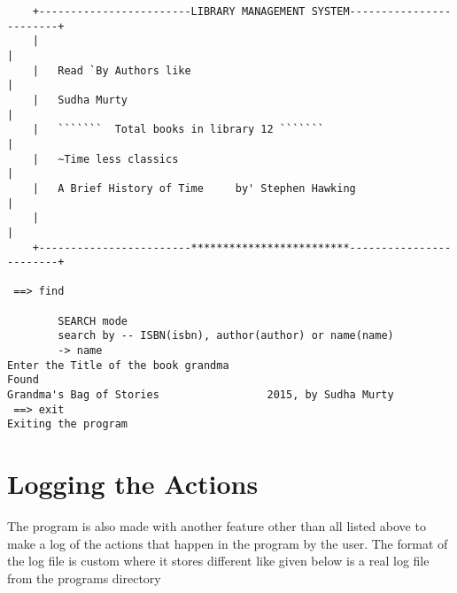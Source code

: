 \documentclass[12pt, a4paper, titlepage, openany]{report}
\begin{document}
{\begin{verbatim}
    +------------------------LIBRARY MANAGEMENT SYSTEM------------------------+
    |                                                                         |
    |   Read `By Authors like                                                 |    
    |   Sudha Murty                                                           |                          
    |   ```````  Total books in library 12 ```````                            |
    |   ~Time less classics                                                   |
    |   A Brief History of Time     by' Stephen Hawking                       |
    |                                                                         |
    +------------------------*************************------------------------+
        
 ==> find

        SEARCH mode
        search by -- ISBN(isbn), author(author) or name(name)
        -> name
Enter the Title of the book grandma
Found
Grandma's Bag of Stories                 2015, by Sudha Murty
 ==> exit
Exiting the program

\end{verbatim}
}

\newpage

\section{Logging the Actions}
The program is also made with another feature other than all listed above to make a log of the actions that happen in the program by the user. The format of the log file is custom where it stores different like given below is a real log file from the programs directory 
\end{document}

